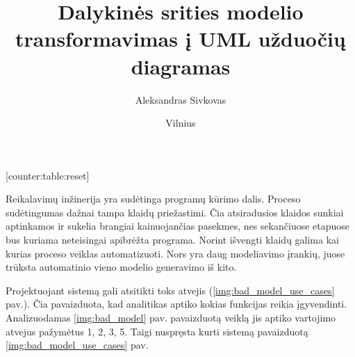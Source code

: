 \documentclass{VUMIFInfBakalaurinis}
\title{Dalykinės srities modelio transformavimas į UML užduočių diagramas}
\author{Aleksandras Sivkovas}
\date{Vilnius \\ \the\year}
\begin{document}
[counter:table:reset]
\newcommand\rownumber{\stepcounter{counter:table}\arabic{counter:table}}

\maketitle

\tableofcontents





Reikalavimų inžinerija yra sudėtinga programų kūrimo dalis. Proceso sudėtingumas dažnai tampa klaidų priežastimi. Čia atsiradusios klaidos sunkiai aptinkamos ir sukelia brangiai kainuojančias pasekmes, nes sekančiuose etapuose bus kuriama neteisingai apibrėžta programa. Norint išvengti klaidų galima kai kurias proceso veiklas automatizuoti. Nors yra daug modeliavimo įrankių, juose trūksta automatinio vieno modelio generavimo iš kito.

Projektuojant sistemą gali atsitikti toks atvejis (\ref{img:bad_model_use_cases} pav.). Čia pavaizduota, kad analitikas aptiko kokias funkcijas reikia įgyvendinti. Analizuodamas \ref{img:bad_model} pav. pavaizduotą veiklą jis aptiko vartojimo atvejus pažymėtus 1, 2, 3, 5. Taigi nuspręsta kurti sistemą pavaizduotą  \ref{img:bad_model_use_cases} pav. 
\end{document}
